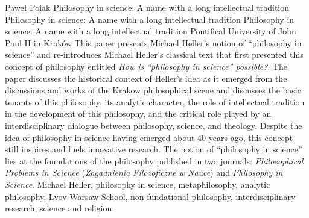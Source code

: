 \begin{artengenv}{Paweł Polak}
	{Philosophy in science: A name with a long intellectual tradition}
	{Philosophy in science: A name with a long intellectual tradition}
	{Philosophy in science: A name with a long intellectual tradition}
	{Pontifical University of John Paul II in Kraków\label{polak-start}}
	{This paper presents Michael Heller’s notion of ``philosophy in science'' and re-introduces Michael Heller’s classical
		text that first presented this concept of philosophy entitled \textit{How is ``philosophy in science''
			possible?}. The paper discusses the historical context of Heller’s idea as it emerged from the discussions and works of
		the Krakow philosophical scene and discusses the basic tenants of this philosophy, its analytic character, the role of
		intellectual tradition in the development of this philosophy, and the critical role played by an interdisciplinary
		dialogue between philosophy, science, and theology. Despite the idea of philosophy in science having emerged about 40
		years ago, this concept still inspires and fuels innovative research. The notion of ``philosophy in science'' lies at the
		foundations of the philosophy published in two journals: \textit{Philosophical Problems in Science}
		(\textit{Zagadnienia Filozoficzne w Nauce}) and \textit{Philosophy in Science}.}
	{Michael Heller, philosophy in science, metaphilosophy, analytic philosophy, Lvov-Warsaw School, non-fundational philosophy, interdisciplinary research, science and religion.}







\end{artengenv}
